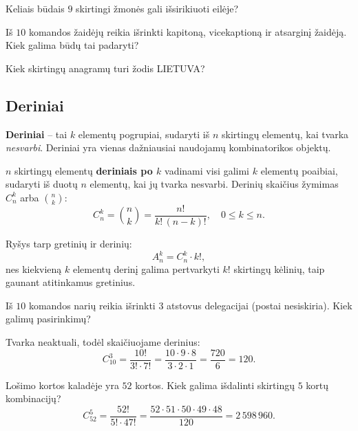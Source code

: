 \begin{exercise}
Keliais būdais $9$ skirtingi žmonės gali išsirikiuoti eilėje?
\end{exercise}

\begin{exercise}
Iš $10$ komandos žaidėjų reikia išrinkti kapitoną, vicekaptioną ir atsarginį žaidėją. Kiek galima būdų tai padaryti?
\end{exercise}

\begin{exercise}
Kiek skirtingų anagramų turi žodis \textsc{LIETUVA}?
\end{exercise}

\subsection{Deriniai}

\textbf{Deriniai} -- tai $k$ elementų pogrupiai, sudaryti iš $n$ skirtingų elementų, kai tvarka \emph{nesvarbi}. Deriniai yra vienas dažniausiai naudojamų kombinatorikos objektų.

\begin{definition}[Deriniai]
$n$ skirtingų elementų \textbf{deriniais po $k$} vadinami visi galimi $k$ elementų poaibiai, sudaryti iš duotų $n$ elementų, kai jų tvarka nesvarbi. Derinių skaičius žymimas $C_n^k$ arba $\displaystyle\binom{n}{k}$:
\[
C_n^k = \binom{n}{k} = \frac{n!}{k!\,(n-k)!}, \quad 0 \leq k \leq n.
\]
\end{definition}

\begin{remark}
Ryšys tarp gretinių ir derinių:
\[
A_n^k = C_n^k \cdot k!,
\]
nes kiekvieną $k$ elementų derinį galima pertvarkyti $k!$ skirtingų kėlinių, taip gaunant atitinkamus gretinius.
\end{remark}

\begin{example}
Iš $10$ komandos narių reikia išrinkti $3$ atstovus delegacijai (postai nesiskiria). Kiek galimų pasirinkimų?

Tvarka neaktuali, todėl skaičiuojame derinius:
\[
C_{10}^{3} = \frac{10!}{3!\cdot 7!} = \frac{10 \cdot 9 \cdot 8}{3 \cdot 2 \cdot 1} = \frac{720}{6} = 120.
\]
\end{example}

\begin{example}
Lošimo kortos kaladėje yra $52$ kortos. Kiek galima išdalinti skirtingų $5$ kortų kombinacijų?
\[
C_{52}^{5} = \frac{52!}{5!\cdot 47!} = \frac{52 \cdot 51 \cdot 50 \cdot 49 \cdot 48}{120} = 2\,598\,960.
\]
\end{example}

